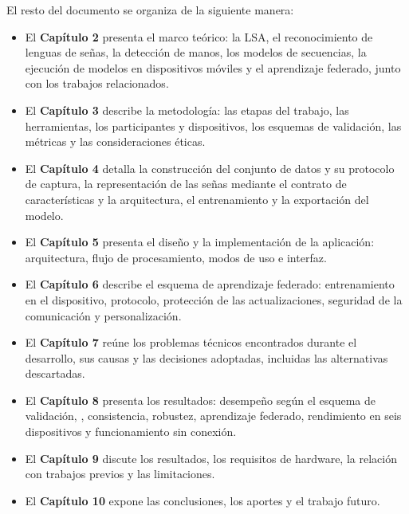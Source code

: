 El resto del documento se organiza de la siguiente manera:

\begin{itemize}
    \item El \textbf{Capítulo 2} presenta el marco teórico: la LSA, el reconocimiento de lenguas de señas, la detección de manos, los modelos de secuencias, la ejecución de modelos en dispositivos móviles y el aprendizaje federado, junto con los trabajos relacionados.
    \item El \textbf{Capítulo 3} describe la metodología: las etapas del trabajo, las herramientas, los participantes y dispositivos, los esquemas de validación, las métricas y las consideraciones éticas.
    \item El \textbf{Capítulo 4} detalla la construcción del conjunto de datos y su protocolo de captura, la representación de las señas mediante el contrato de características y la arquitectura, el entrenamiento y la exportación del modelo.
    \item El \textbf{Capítulo 5} presenta el diseño y la implementación de la aplicación: arquitectura, flujo de procesamiento, modos de uso e interfaz.
    \item El \textbf{Capítulo 6} describe el esquema de aprendizaje federado: entrenamiento en el dispositivo, protocolo, protección de las actualizaciones, seguridad de la comunicación y personalización.
    \item El \textbf{Capítulo 7} reúne los problemas técnicos encontrados durante el desarrollo, sus causas y las decisiones adoptadas, incluidas las alternativas descartadas.
    \item El \textbf{Capítulo 8} presenta los resultados: desempeño según el esquema de validación, , consistencia, robustez, aprendizaje federado, rendimiento en seis dispositivos y funcionamiento sin conexión.
    \item El \textbf{Capítulo 9} discute los resultados, los requisitos de hardware, la relación con trabajos previos y las limitaciones.
    \item El \textbf{Capítulo 10} expone las conclusiones, los aportes y el trabajo futuro.
\end{itemize}
